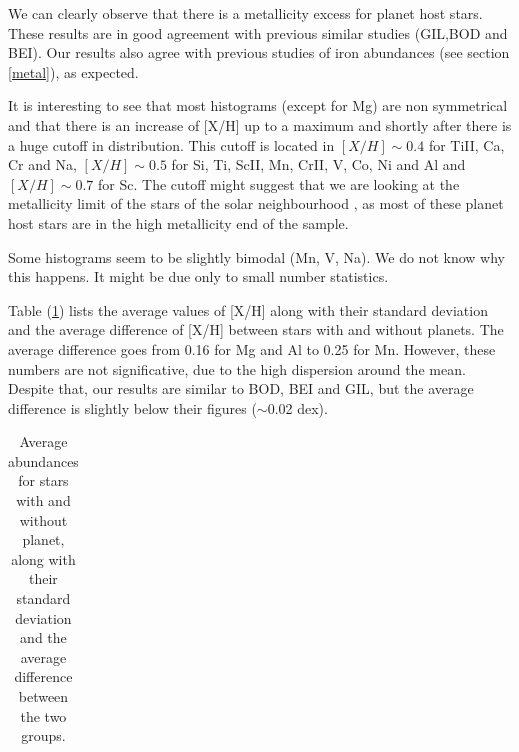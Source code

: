 \documentclass[dvips,12pt,a4paper]{report}
\begin{document}
{{We can clearly observe that there is a metallicity excess for planet host stars. These results are in good agreement with previous similar studies (GIL,BOD and BEI). Our results also agree with previous studies of iron abundances (see section \ref{metal}), as expected.

It is interesting to see that most histograms (except for Mg) are non symmetrical and that there is an increase of [X/H] up to a maximum and shortly after there is a huge cutoff in distribution. This cutoff is located in $[X/H]\sim0.4$ for TiII, Ca, Cr and Na, $[X/H]\sim0.5$ for Si, Ti, ScII, Mn, CrII, V, Co, Ni and Al and $[X/H]\sim0.7$ for Sc. The cutoff might suggest that we are looking at the metallicity limit of the stars of the solar neighbourhood \citep[e.g.][]{Santos-2003}, as most of these planet host stars are in the high metallicity end of the sample. 

Some histograms seem to be slightly bimodal (Mn, V, Na). We do not know why this happens. It might be due only to small number statistics. 

Table (\ref{avgabund}) lists the average values of [X/H] along with their standard deviation and the average difference of [X/H] between stars with and without planets. The average difference goes from 0.16 for Mg and Al to 0.25 for Mn. However, these numbers are not significative, due to the high dispersion around the mean. Despite that, our results are similar to BOD, BEI and GIL, but the average difference is slightly below their figures ($\sim$0.02 dex).

\begin{table}[h]\footnotesize
\label {avgabund}
\centering
\caption[Average abundances for stars with and with planets ]{Average abundances for stars with and without planet, along with their standard deviation and the average difference between the two groups.} 
\begin{tabular}{ l c c c c c}


\end{tabular}
\end{table}}}
\end{document}
